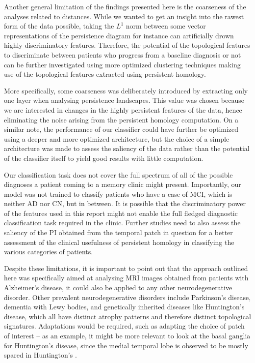\documentclass{article}
\begin{document}
Another general limitation of the findings presented here is the coarseness of the analyses related
to distances. While we wanted to get an insight into the rawest form of the data possible, taking
the $L^1$ norm between some vector representations of the persistence diagram for instance can
artificially drown highly discriminatory features. Therefore, the potential of the topological
features to discriminate between patients who progress from a baseline diagnosis or not can be
further investigated using more optimized clustering techniques making use of the topological
features extracted using persistent homology.

More specifically, some coarseness was deliberately introduced by extracting only one layer when
analysing persistence landscapes. This value was chosen because we are interested in changes in the
highly persistent features of the data, hence eliminating the noise arising from the persistent
homology computation. On a similar note, the performance of our classifier could have further be
optimized using a deeper and more optimized architecture, but the choice of a simple architecture
was made to assess the saliency of the data rather than the potential of the classifier itself to
yield good results with little computation.

Our classification task does not cover the full spectrum of all of the possible diagnoses a patient
coming to a memory clinic might present. Importantly, our model was not trained to classify patients
who have a case of MCI, which is neither AD nor CN, but in between. It is possible that the
discriminatory power of the features used in this report might not enable the full fledged
diagnostic classification task required in the clinic. Further studies need to also assess the
saliency of the PI obtained from the temporal patch in question for a better assessment of the
clinical usefulness of persistent homology in classifying the various categories of patients.

Despite these limitations, it is important to point out that the approach outlined here was
specifically aimed at analysing MRI images obtained from patients with Alzheimer's disease, it could
also be applied to any other neurodegenerative disorder. Other prevalent neurodegenerative disorders
include Parkinson's disease, dementia with Lewy bodies, and genetically inherited diseases like
Huntington's disease, which all have distinct atrophy patterns and therefore distinct topological signatures.
Adaptations would be required, such as adapting the choice of patch of interest -- as an example, it
might be more relevant to look at the basal ganglia for Huntington's disease, since the medial
temporal lobe is observed to be mostly spared in Huntington's
\citep{kuhl1982cerebral, halliday1998regional, kassubek2004topography}.
\end{document}

